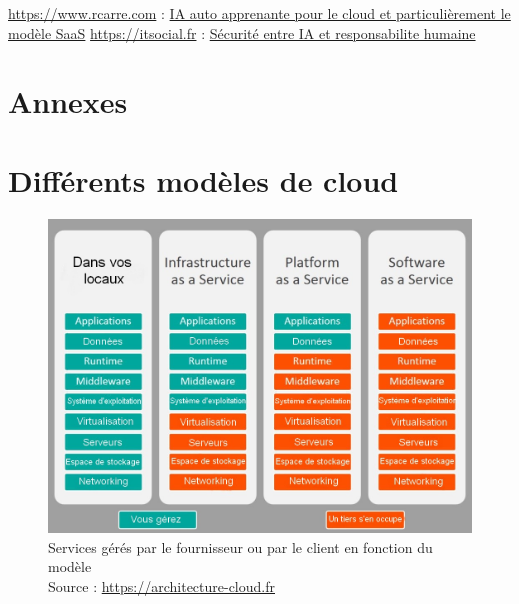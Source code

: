 \documentclass[a4paper, 12pt]{article}
\begin{document}
\begin{thebibliography}{3}
    \bibitem{} \url{https://www.rcarre.com} : \href{https://www.rcarre.com/blog/intelligence-artificielle-auto-apprenante-pour-le-cloud-and-saas/}{IA auto apprenante pour le cloud et particulièrement le modèle SaaS}
    \bibitem{} \url{https://itsocial.fr} : \href{https://itsocial.fr/partenaires/oracle-partenaire/tribunes-oracle/securite-du-cloud-entre-intelligence-artificielle-et-responsabilite-humaine/}{Sécurité entre IA et responsabilite humaine}
  \end{thebibliography}

  \newpage
  \section*{Annexes}
  \appendix
    \section{Différents modèles de cloud}
      \begin{figure}[h]
        \centering
        \includegraphics[scale=.4]{img/modeles.jpg}
        \caption{Services gérés par le fournisseur ou par le client en
        fonction du modèle \\ Source : \url{https://architecture-cloud.fr}}
      \end{figure}
      \label{modeles}
\end{document}
